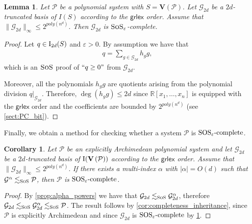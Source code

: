 \documentclass[11pt]{article}
\newcommand{\sos}{\text{\sc{SoS}}}
\newcommand{\grlexns}{\textsf{grlex}}
\newcommand{\Variety}[1]{{\textbf{V}}\left( #1 \right)}
\newcommand{\I}{\emph{$\rm{I}$}}
\newcommand{\1}{\textbf{1}}
\newcommand{\GB}{\text{Gr\"{o}bner} }
\newtheorem{lemma}[theorem]{Lemma}
\newtheorem{corollary}[theorem]{Corollary}
\newcommand{\SOSe}{\rm{SOS}_\varepsilon\text{-complete}}
\begin{document}
\begin{lemma}\label{th:Grobner_basis_SOS_completeness}
    Let $\mathcal{P}$ be a polynomial system with $S = \Variety{\mathcal{P}}$. Let $\mathcal{G}_{2d}$ be a $2d$-truncated \GB basis of $I(S)$ according to the $\grlexns$ order. Assume that $\| \mathcal{G}_{2d} \|_{\infty} \leq 2^{poly(n^d)}$. Then $\mathcal{G}_{2d}$ is $\sos_{\varepsilon}$-complete.
\end{lemma}
\begin{proof}
    Let $q \in \I_{2d}(S)$ and $\varepsilon > 0$. By assumption we have that
    \begin{align*}
        q = \sum_{g \in \mathcal{G}_{2d}} h_g g,
    \end{align*}
    which is an $\sos$ proof of $``q \geq 0"$ from $\mathcal{G}_{2d}$.
    
    Moreover, all the polynomials $h_g g$ are quotients arising from the polynomial division $q|_{\mathcal{G}_{2d}}$. Therefore, $\deg(h_g g) \leq 2d$ since $\mathbb{R}[x_1, \dots, x_n]$ is equipped with the $\grlexns$ order and the coefficients are bounded by $2^{poly(n^d)}$ (see \cref{sect:PC_bit}).
\end{proof}

Finally, we obtain a method for checking whether a system $\mathcal{P}$ is $\SOSe$.


\begin{corollary}\label{cor:powers-complete}
    Let $\mathcal{P}$ be an explicitly Archimedean polynomial system and let $\mathcal{G}_{2d}$ be a $2d$-truncated \GB basis of $\I(\Variety{\mathcal{P}})$ according to the $\grlexns$ order. Assume that $\| \mathcal{G}_{2d} \|_{\infty} \leq 2^{poly(n^d)}$. If there exists a multi-index $\alpha$ with $|\alpha| = O(d)$ such that $\mathcal{G}^\alpha \lesssim_{\sos} \mathcal{P}$, then $\mathcal{P}$ is $\SOSe$.
\end{corollary}

\begin{proof}
    By \cref{prop:alpha_powers} we have that $\mathcal{G}_{2d} \lesssim_{\sos} \mathcal{G}_{2d}^{\alpha}$, therefore $\mathcal{G}_{2d} \lesssim_{\sos} \mathcal{G}_{2d}^{\alpha} \lesssim_{\sos} \mathcal{P}$. The result follows by \cref{cor:completeness_inheritance}, since $\mathcal{P}$ is explicitly Archimedean and since $\mathcal{G}_{2d}$ is $\SOSe$ by \cref{th:Grobner_basis_SOS_completeness}.
\end{proof}
\end{document}
